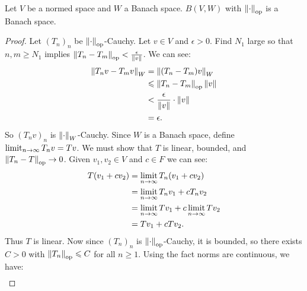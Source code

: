     \begin{proposition}\label{prop:bounded-ops-is-complete}
        Let $V$ be a normed space and $W$ a Banach space. $B(V,W)$ with $\left\lVert \cdot \right\rVert_{\operatorname{op}}$ is a Banach space.
    \end{proposition}
        \begin{proof}
            Let $(T_n)_n$ be $\left\lVert \cdot \right\rVert_{\operatorname{op}}$-Cauchy. Let $v \in V$ and $\epsilon > 0$. Find $N_1$ large so that $n,m \geq N_1$ implies $\left\lVert T_n - T_m \right\rVert_{\operatorname{op}} < \frac{\epsilon}{\left\lVert v \right\rVert}$. We can see:
                \begin{equation*}
                \begin{split}
                    \left\lVert T_nv - T_mv \right\rVert_W
                    & = \left\lVert (T_n - T_m)v \right\rVert_W \\
                    & \leqslant \left\lVert T_n - T_m \right\rVert_{\operatorname{op}}\left\lVert v \right\rVert \\
                    & < \frac{\epsilon}{\left\lVert v \right\rVert} \cdot \left\lVert v \right\rVert \\
                    & = \epsilon.
                \end{split}
                \end{equation*}
            So $(T_nv)_n$ is $\left\lVert \cdot \right\rVert_W$-Cauchy. Since $W$ is a Banach space, define $\operatorname*{limit}_{n \rightarrow \infty}T_n v = Tv$. We must show that $T$ is linear, bounded, and $\left\lVert T_n - T \right\rVert_{\operatorname{op}} \rightarrow 0$. Given $v_1,v_2 \in V$ and $c \in F$ we can see:
                \begin{equation*}
                \begin{split}
                    T(v_1 + cv_2) 
                    & = \operatorname*{limit}_{n \rightarrow \infty} T_n(v_1 + c v_2) \\
                    & = \operatorname*{limit}_{n \rightarrow \infty}T_nv_1 + c T_n v_2 \\
                    & = \operatorname*{limit}_{n \rightarrow \infty}Tv_1 + c\operatorname*{limit}_{n \rightarrow \infty}T v_2 \\
                    & = Tv_1 + cT v_2.
                \end{split}
                \end{equation*}
            Thus $T$ is linear. Now since $(T_n)_n$ is $\left\lVert \cdot \right\rVert_{\operatorname{op}}$-Cauchy, it is bounded, so there exists $C > 0$ with $\left\lVert T_n \right\rVert_{\operatorname{op}} \leqslant C$ for all $n \geq 1$. Using the fact norms are continuous, we have:
                \begin{equation*}
                \begin{split}

\end{split}
\end{equation*}
\end{proof}
